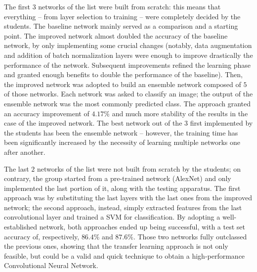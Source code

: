 \documentclass[a4paper, 11pt]{article} %
\begin{document}
The first $3$ networks of the list were built from scratch: this means that everything \--- from layer selection to training \--- were completely decided by the students. The baseline network mainly served as a comparison and a starting point. The improved network almost doubled the accuracy of the baseline network, by only implementing some crucial changes (notably, data augmentation and addition of batch normalization layers were enough to improve drastically the performance of the network. Subsequent improvements refined the learning phase and granted enough benefits to double the performance of the baseline). Then, the improved network was adopted to build an ensemble network composed of $5$ of those networks. Each network was asked to classify an image; the output of the ensemble network was the most commonly predicted class. The approach granted an accuracy improvement of $4.17\%$ and much more stability of the results in the case of the improved network. The best network out of the $3$ first implemented by the students has been the ensemble network \--- however, the training time has been significantly increased by the necessity of learning multiple networks one after another.

The last $2$ networks of the list were not built from scratch by the students; on contrary, the group started from a pre-trained network (AlexNet) and only implemented the last portion of it, along with the testing apparatus. The first approach was by substituting the last layers with the last ones from the improved network; the second approach, instead, simply extracted features from the last convolutional layer and trained a SVM for classification. By adopting a well-established network, both approaches ended up being successful, with a test set accuracy of, respectively, $86.4\%$ and $87.6\%$. Those two networks fully outclassed the previous ones, showing that the transfer learning approach is not only feasible, but could be a valid and quick technique to obtain a high-performance Convolutional Neural Network.
\end{document}
